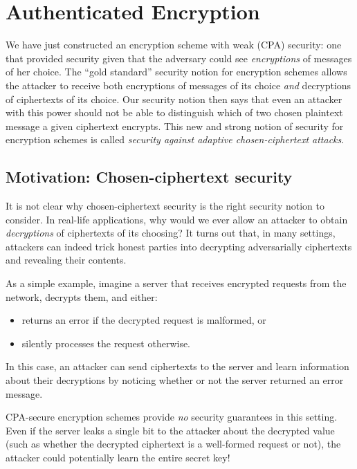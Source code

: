 \chapter{Authenticated Encryption}

We have just constructed an encryption scheme with
weak (CPA) security: one that provided security
given that the adversary could see
\emph{encryptions} of messages of her choice.
The ``gold standard'' security notion for encryption
schemes allows the attacker to receive both encryptions
of messages of its choice 
\emph{and} decryptions of ciphertexts of its choice.
Our security notion then says that 
even an attacker with this power should not be
able to distinguish which of two chosen plaintext
message a given ciphertext encrypts.
This new and strong notion of security for encryption
schemes is called 
\emph{security against adaptive chosen-ciphertext attacks}.

\section{Motivation: Chosen-ciphertext security}
It is not clear why chosen-ciphertext security is the right 
security notion to consider. 
In real-life applications, why would we ever allow an attacker
to obtain \emph{decryptions} of ciphertexts of its choosing?
It turns out that, in many settings, attackers can indeed
trick honest parties into decrypting adversarially ciphertexts
and revealing their contents.

As a simple example, imagine a server that receives encrypted
requests from the network, decrypts them, and either:
\begin{itemize}
  \item returns an error if the decrypted request is malformed, or
  \item silently processes the request otherwise.
\end{itemize}
In this case, an attacker can send ciphertexts to the server and
learn information about their decryptions by noticing whether or not
the server returned an error message.

CPA-secure encryption schemes provide \emph{no} security guarantees
in this setting. Even if the server leaks a single bit to the attacker 
about the
decrypted value (such as whether the decrypted ciphertext is a
well-formed request or not), the attacker could potentially learn 
the entire secret key!

